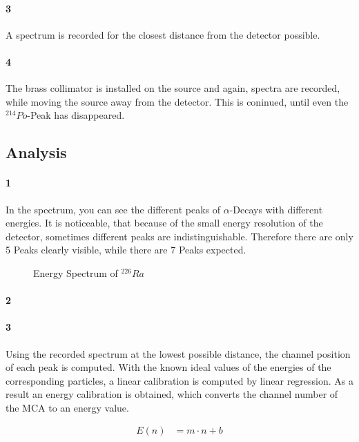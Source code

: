 \documentclass[12pt,twoside,a4paper]{scrartcl}
\begin{document}
		\paragraph{3}
			A spectrum is recorded for the closest distance from the detector possible.

		\paragraph{4}
			The brass collimator is installed on the source and again, spectra are recorded, while moving the source away from the detector. This is coninued, until even the $^{214}Po$-Peak has disappeared.

	\subsection{Analysis}

		\paragraph{1}

			In the spectrum, you can see the different peaks of $\alpha$-Decays with different energies. It is noticeable, that because of the small energy resolution of the detector, sometimes different peaks are indistinguishable. Therefore there are only 5 Peaks clearly visible, while there are 7 Peaks expected.

			\begin{figure}
				\caption{Energy Spectrum of $ ^{226}Ra$}
				\label{SI::Spectrum}
			\end{figure}

		\paragraph{2}

		\paragraph{3}
			Using the recorded spectrum at the lowest possible distance, the channel position of each peak is computed. With the known ideal values of the energies of the corresponding particles, a linear calibration is computed by linear regression. As a result an energy calibration is obtained, which converts the channel number of the MCA to an energy value.

			\begin{align}
					E(n) &= m \cdot n + b
			\end{align}
\end{document}
